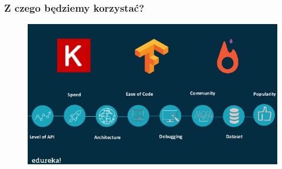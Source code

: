\documentclass[17pt]{beamer}
\begin{document}
\begin{frame}
\frametitle{Z czego będziemy korzystać?}
\begin{figure}[ht]
\includegraphics[scale=0.3]{./frameworks.jpg}
\end{figure}
\end{frame}
\end{document}
